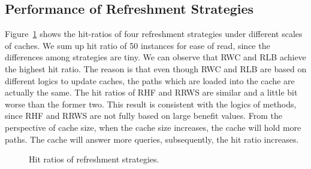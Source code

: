 \subsection{Performance of Refreshment Strategies}
\label{ssec:overhead-strategy}

Figure~\ref{fig:comparison-hit} shows the hit-ratios of four refreshment strategies under different scales of caches.
We sum up hit ratio of 50 instances for ease of read, since the differences among strategies are tiny.
We can observe that RWC and RLB achieve the highest hit ratio. The reason is that even though RWC and RLB are based on different logics to update caches, the paths which are loaded into the cache are actually the same.
The hit ratios of RHF and RRWS are similar and a little bit worse than the former two. This result is consistent with the logics of methods, since RHF and RRWS are not fully based on large benefit values.
From the perspective of cache size, when the cache size increases, the cache will hold more paths. The cache will answer more queries, subsequently, the hit ratio increases.


\begin{figure}[htbp]
\centering
 \caption{Hit ratios of refreshment strategies.}
 \label{fig:comparison-hit}
\end{figure}


